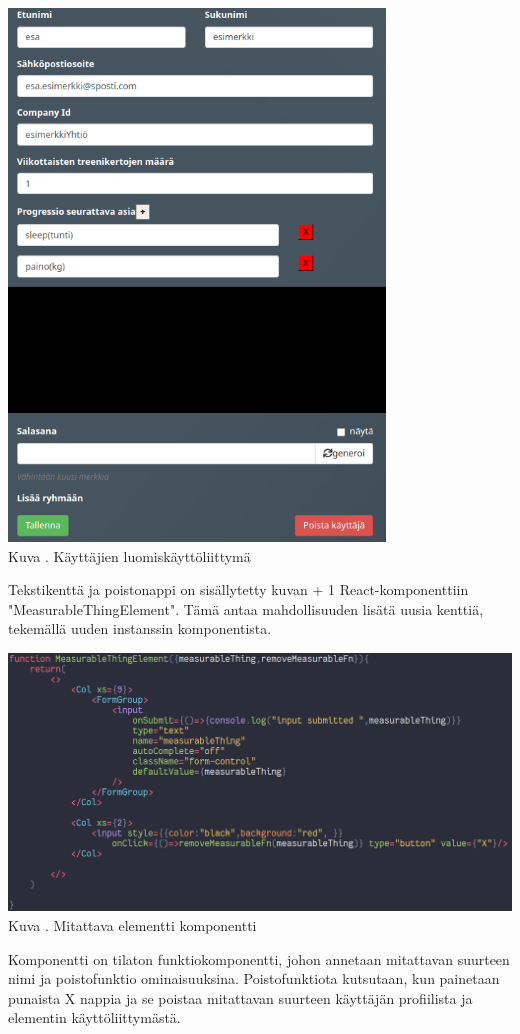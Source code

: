 \bigskip
\includegraphics[width = 10cm]{src/public/oppar/adminUserProfilePostcencoredroles.png}\\
Kuva \getImgCount {}. Käyttäjien luomiskäyttöliittymä 
\bigskip

Tekstikenttä ja poistonappi on sisällytetty kuvan {\the\numexpr \theimgCounter + 1 } React-komponenttiin "MeasurableThingElement". 
Tämä antaa mahdollisuuden lisätä uusia kenttiä, tekemällä uuden instanssin komponentista.

\includegraphics[width = 15cm]{src/public/oppar/measurableElementComponent.png}\\
Kuva \getImgCount {}. Mitattava elementti komponentti
\medskip

Komponentti on tilaton funktiokomponentti, johon annetaan mitattavan suurteen nimi ja poistofunktio ominaisuuksina.
Poistofunktiota kutsutaan, kun painetaan punaista X nappia ja se poistaa mitattavan suurteen käyttäjän profiilista ja elementin käyttöliittymästä.
\medskip












